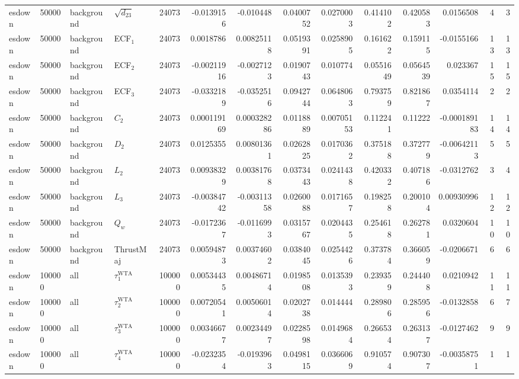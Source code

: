 \begin{landscape}
\begin{longtable}{llll r rrrr rr r rr}
esdown & 50000 & background & $\sqrt{d_{23}}$ & 24073 & -0.0139156 & -0.010448 & 0.0400752 & 0.0270003 & 0.414102 & 0.420583 & 0.0156508 & 4 & 3 \\
esdown & 50000 & background & ECF$_1$ & 24073 & 0.0018786 & 0.00825118 & 0.0519391 & 0.0258905 & 0.161622 & 0.159115 & -0.0155166 & 13 & 13 \\
esdown & 50000 & background & ECF$_2$ & 24073 & -0.00211916 & -0.0027123 & 0.0190743 & 0.010774 & 0.0551649 & 0.0564539 & 0.023367 & 15 & 15 \\
esdown & 50000 & background & ECF$_3$ & 24073 & -0.0332189 & -0.0352516 & 0.0942744 & 0.0648063 & 0.793759 & 0.821867 & 0.0354114 & 2 & 2 \\
esdown & 50000 & background & $C_2$ & 24073 & 0.000119169 & 0.000328286 & 0.0118889 & 0.00705153 & 0.112241 & 0.11222 & -0.000189183 & 14 & 14 \\
esdown & 50000 & background & $D_2$ & 24073 & 0.0125355 & 0.00801361 & 0.0262825 & 0.0170362 & 0.375188 & 0.372779 & -0.00642113 & 5 & 5 \\
esdown & 50000 & background & $L_2$ & 24073 & 0.00938329 & 0.00381768 & 0.0373443 & 0.0241438 & 0.420332 & 0.407186 & -0.0312762 & 3 & 4 \\
esdown & 50000 & background & $L_3$ & 24073 & -0.00384742 & -0.00311358 & 0.0260088 & 0.0171657 & 0.198258 & 0.200104 & 0.00930996 & 12 & 12 \\
esdown & 50000 & background & $Q_w$ & 24073 & -0.0172367 & -0.0116993 & 0.0315767 & 0.0204435 & 0.254618 & 0.262781 & 0.0320604 & 10 & 10 \\
esdown & 50000 & background & ThrustMaj & 24073 & 0.00594873 & 0.00374602 & 0.0384045 & 0.0254426 & 0.373784 & 0.366059 & -0.0206671 & 6 & 6 \\
esdown & 100000 & all & $\tau_1^{\mathrm{WTA}}$ & 100000 & 0.00534435 & 0.00486714 & 0.0198508 & 0.0135393 & 0.239359 & 0.244408 & 0.0210942 & 11 & 11 \\
esdown & 100000 & all & $\tau_2^{\mathrm{WTA}}$ & 100000 & 0.00720541 & 0.00506014 & 0.0202738 & 0.014444 & 0.289806 & 0.285956 & -0.0132858 & 6 & 7 \\
esdown & 100000 & all & $\tau_3^{\mathrm{WTA}}$ & 100000 & 0.00346677 & 0.00234497 & 0.0228598 & 0.0149684 & 0.266534 & 0.263137 & -0.0127462 & 9 & 9 \\
esdown & 100000 & all & $\tau_4^{\mathrm{WTA}}$ & 100000 & -0.0232354 & -0.0193963 & 0.0498115 & 0.0366069 & 0.910574 & 0.907307 & -0.00358751 & 1 & 1 \\

\end{longtable}
\end{landscape}
